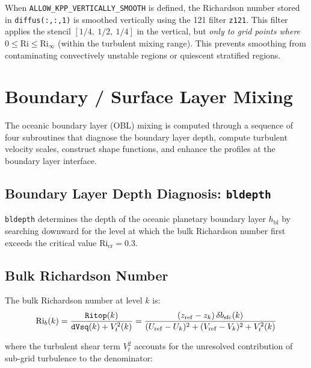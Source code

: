 \documentclass[12pt,letterpaper]{article}
\newcommand{\hbl}{h_{\mathrm{bl}}}
\newcommand{\Ri}{\mathrm{Ri}}
\newcommand{\Ricr}{\mathrm{Ri_{cr}}}
\begin{document}
When \texttt{ALLOW\_KPP\_VERTICALLY\_SMOOTH} is defined, the Richardson  
number stored in \texttt{diffus(:,:,1)} is smoothed vertically using  
the 121 filter \texttt{z121}. This filter applies the stencil  
$[1/4,\ 1/2,\ 1/4]$ in the vertical, but \textit{only to grid points  
where $0 \leq \Ri \leq \Ri_\infty$} (within the turbulent mixing range).  
This prevents smoothing from contaminating convectively unstable regions  
or quiescent stratified regions.  
  
\section{Boundary / Surface Layer Mixing}  
\label{sec:boundary_layer_mixing}  
  
The oceanic boundary layer (OBL) mixing is computed through a sequence  
of four subroutines that diagnose the boundary layer depth, compute  
turbulent velocity scales, construct shape functions, and enhance the  
profiles at the boundary layer interface.  
  
\subsection{Boundary Layer Depth Diagnosis: \texttt{bldepth}}  
\label{subsec:bldepth}  
  
\texttt{bldepth} determines the depth of the oceanic planetary boundary  
layer $\hbl$ by searching downward for the level at which the bulk  
Richardson number first exceeds the critical value $\Ricr = 0.3$.  
  
\subsection{Bulk Richardson Number}  
  
The bulk Richardson number at level $k$ is:  
\begin{equation}  
\Ri_b(k) = \frac{\texttt{Ritop}(k)}{\texttt{dVsq}(k) + V_t^2(k)}  
= \frac{(z_{\rm ref} - z_k)\,\delta b_{\rm sfc}(k)}  
  {(U_{\rm ref} - U_k)^2 + (V_{\rm ref} - V_k)^2 + V_t^2(k)}  
\end{equation}  
  
where the turbulent shear term $V_t^2$ accounts for the unresolved  
contribution of sub-grid turbulence to the denominator:  
  
\end{document}
